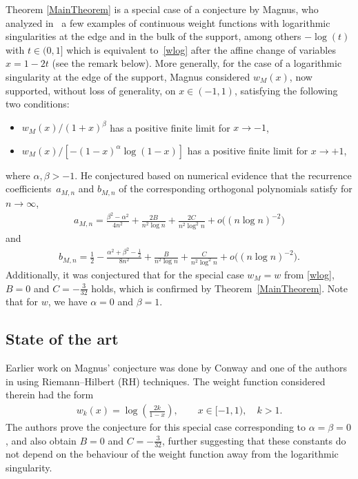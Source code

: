 \documentclass[11pt]{article}
\numberwithin{equation}{section}
\numberwithin{equation}{section}
\begin{document}
Theorem \ref{MainTheorem} is a special case of a conjecture by Magnus, who analyzed in~\cite{Mag18} a few examples of continuous weight functions with logarithmic singularities at the edge and in the bulk of the support, among others $-\log(t)$ with $t \in (0, 1]$ which is equivalent to~\eqref{wlog} after the affine change of variables $x = 1-2t$ (see the remark below). More generally, for the case of a logarithmic singularity at the edge of the support, Magnus considered $w_M(x)$, now supported, without loss of generality, on $x \in (-1,1)$, satisfying the following two conditions:
\begin{itemize}\itemsep=0pt
 \item $w_M(x)/(1+x)^{\beta}$ has a positive finite limit for $x \to -1$,
 \item $w_M(x)/[-(1-x)^{\alpha}\log(1-x)]$ has a positive finite limit for $x \to +1$,
\end{itemize}
where $\alpha, \beta > -1$. He conjectured based on numerical evidence that the recurrence coefficients~$a_{M,n}$ and $b_{M,n}$ of the corresponding orthogonal polynomials satisfy for $n \to \infty$,
\begin{align}\label{MagA}
 a_{M,n} = \frac{\beta^2-\alpha^2}{4n^2} + \frac{2B}{n^2\log n} + \frac{2C}{n^2 \log^2 n} + o\big((n \log n)^{-2}\big)
\end{align}
and
\begin{align}\label{MagB}
 b_{M,n} = \frac{1}{2} - \frac{\alpha^2 +\beta^2-\frac{1}{2}}{8n^2} + \frac{B}{n^2 \log n} + \frac{C}{n^2 \log^2 n} + o\big((n \log n)^{-2}\big).
\end{align}
Additionally, it was conjectured that for the special case $w_M = w$ from \eqref{wlog}, $B = 0$ and $C = -\frac{3}{32}$ holds, which is confirmed by Theorem~\ref{MainTheorem}. Note that for $w$, we have $\alpha = 0$ and $\beta = 1$.

\setcounter{Theorem}{2}
\subsection{State of the art}
Earlier work on Magnus' conjecture was done by Conway and one of the authors in \cite{CD} using Riemann--Hilbert (RH) techniques. The weight function considered therein had the form
\begin{align}\label{wk}
 w_k(x)= \log \left(\frac{2k}{1-x}\right), \qquad x \in [-1,1), \quad k > 1.
\end{align}
The authors prove the conjecture for this special case corresponding to $\alpha = \beta = 0$, and also obtain $B = 0$ and $C = -\frac{3}{32}$, further suggesting that these constants do not depend on the behaviour of the weight function away from the logarithmic singularity.
\end{document}
